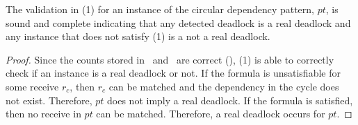 
\begin{lemma}
The validation in (1) for an instance of the circular dependency pattern, $\mathit{pt}$, is sound and complete indicating that any detected deadlock is a real deadlock and any instance that does not satisfy (1) is a not a real deadlock. 
\label{lemma:circular}
\end{lemma}
\begin{proof}
Since the counts stored in \epsnd\ and \eprcv\ are correct (), (1) is able to correctly check if an instance is a real deadlock or not. If the formula is unsatisfiable for some receive $r_c$, then $r_c$ can be matched and the dependency in the cycle does not exist. Therefore, $\mathit{pt}$ does not imply a real deadlock. If the formula is satisfied, then no receive in $\mathit{pt}$ can be matched. Therefore, a real deadlock occurs for $\mathit{pt}$.
\end{proof} 





